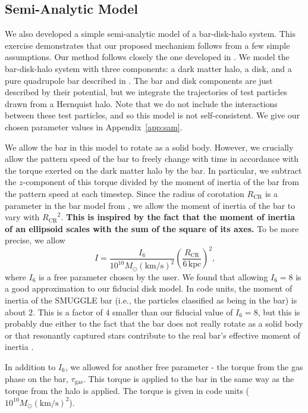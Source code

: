 \documentclass[twocolumn,linenumbers,trackchanges]{aastex631}
\newcommand{\RCR}{\ensuremath{R_{\textrm{CR}}}}
\newcommand{\kms}{\ensuremath{\textrm{km}/\textrm{s}}}
\newcommand{\SMUGGLE}{SMUGGLE}
\newcommand{\Msun}{\ensuremath{M_{\odot}}}
\begin{document}
\subsection{Semi-Analytic Model}
We also developed a simple semi-analytic model of a bar-disk-halo system. This
exercise demonstrates that our proposed mechanism follows from a few simple
assumptions. Our method follows closely the one developed in
\citet{2022MNRAS.513..768C}. We model the bar-disk-halo system with three
components: a dark matter \citet{1990ApJ...356..359H} halo, a
\citet{1975PASJ...27..533M} disk, and a pure quadrupole bar
described in \citet{2022MNRAS.513..768C}. The bar and disk components are just
described by their potential, but we integrate the trajectories of test
particles drawn from a Hernquist halo. Note that we do not include the
interactions between these test particles, and so this model is not
self-consistent. We give our chosen parameter values in Appendix~\ref{app:sam}.

We allow the bar in this model to rotate as a solid body. However, we crucially
allow the pattern speed of the bar to freely change with time in accordance with
the torque exerted on the dark matter halo by the bar. In particular, we
subtract the $z$-component of this torque divided by the moment of inertia of
the bar from the pattern speed at each timestep. Since the radius of corotation
\RCR{} is a parameter in the bar model from \citet{2022MNRAS.513..768C}, we
allow the moment of inertia of the bar to vary with ${\RCR}^2$. {\bf This is
inspired by the fact that the moment of inertia of an ellipsoid scales with the
sum of the square of its axes.} To be more precise, we allow
\begin{equation}
I = \frac{I_6}{10^{10} \Msun (\kms)^2} \left( \frac{\RCR}{6\,\textrm{kpc}} \right)^2\textrm{,}
\end{equation}
where $I_6$ is a free parameter chosen by the user. We found that allowing
$I_6=8$ is a good approximation to our fiducial disk model. In code units, the
moment of inertia of the \SMUGGLE{} bar (i.e., the particles classified as being in
the bar) is about $2$. This is a factor of $4$ smaller than our fiducial value
of $I_6=8$, but this is probably due either to the fact that the bar does not
really rotate as a solid body or that resonantly captured stars contribute to
the real bar's effective moment of inertia \citep{1985MNRAS.213..451W}.

In addition to $I_6$, we allowed for another free parameter - the torque from
the gas phase on the bar, $\tau_{\textrm{gas}}$. This torque is applied to the
bar in the same way as the torque from the halo is applied. The torque is given
in code units ($10^{10}\Msun \left(\kms\right)^2$).
\end{document}
